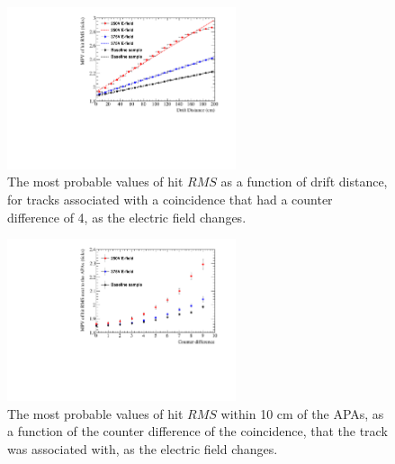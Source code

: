 \begin{figure}[h!]
  \centering
  \includegraphics[width=0.6\textwidth]{Canvas_CountDiff4_All_Positions_ElecField}
  \caption[The drift distance dependence of diffusion in the 35 ton dataset and Monte Carlo for coincidences with a counter difference of 4, as the electric field changes]
          {The most probable values of hit $RMS$ as a function of drift distance, for tracks associated with a coincidence that had a counter difference of 4, as the electric field changes.}
  \label{fig:DiffElecStudy_CDiff4}
\end{figure}

\begin{figure}[h!]
  \centering
  \includegraphics[width=0.6\textwidth]{Canvas_All_Angles_RMS0cm_ElecField}
  \caption[The angular dependence of diffusion in the 35 ton dataset and Monte Carlo for hits within 10 cm of the APAs, as the electric field changes]
          {The most probable values of hit $RMS$ within 10 cm of the APAs, as a function of the counter difference of the coincidence, that the track was associated with, as the electric field changes.}
  \label{fig:DiffElecStudy_RMS0cm}
\end{figure}

